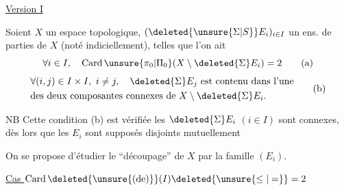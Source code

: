 
\begingroup
\makeatletter
\tagsleft@true
\makeatother
\uline{Version I}

Soient $X$ un espace topologique, $(\deleted{\unsure{\Sigma|S}}E_i)_{i\in I}$ un ens. de parties  de $X$ (noté indiciellement), telles que l'on ait
\reversemarginpar
{}
\normalmarginpar
\[
 \forall i\in I,\quad \operatorname{Card}\unsure{\pi_0|\Pi_0}(X\setminus\deleted{\Sigma}E_i)=2
 \tag*{(a)}
\]
\[
 \begin{aligned}
 &\forall(i,j)\in I\times I,\ i\ne j,\quad \deleted{\Sigma}E_j\ \text{est contenu dans l'une}\\
 &\text{des deux composantes connexes de }X\setminus\deleted{\Sigma}E_i.
 \end{aligned}
 \tag*{(b)}
\]

NB Cette condition (b) est vérifiée  les $\deleted{\Sigma}E_i$ $(i\in I)$ sont connexes, dès lors que les $E_i$ sont supposés disjoints mutuellement

On se propose d'étudier le ``découpage'' de $X$ par la famille $(E_i)$.

\uline{Cas $\operatorname{Card}\deleted{\unsure{(\mathrm{de})}}(I)\deleted{\unsure{\leq|=}}=2$}

